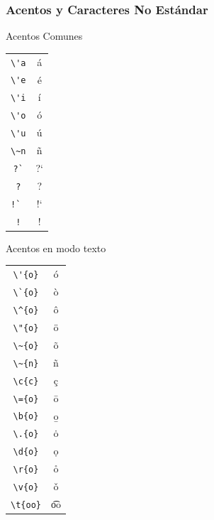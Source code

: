 \documentclass[aspectratio=43]{beamer}%
\begin{document}
\begin{frame}[fragile]
\frametitle{\textbf{Acentos y Caracteres No Estándar}}
\justifying
 \begin{minipage}[l]{0.48\linewidth}
\begin{center}
Acentos Comunes

\begin{tabular}{|c|c|}\hline
  \verb+\'a+&\'a \\
  \verb+\'e+&\'e \\
  \verb+\'i+&\'i \\
  \verb+\'o+&\'o \\
  \verb+\'u+&\'u \\
  \verb+\~n+&\~n \\
  \verb+?`+&?` \\
  \verb+?+&? \\
  \verb+!` +&!`\\
  \verb+!+&! \\\hline
\end{tabular}
\end{center}


\end{minipage}\hfill
\begin{minipage}[r]{0.48\linewidth}
\begin{center}
Acentos en modo texto

\begin{tabular}{|c|c|}\hline
 \verb+\'{o}+ & \'{o}\\
 \verb+\`{o}+ & \`{o}\\
 \verb+\^{o}+ & \^{o}\\
 \verb+\"{o}+ & \"{o}\\
 \verb+\~{o}+ & \~{o}\\
 \verb+\~{n}+ & \~{n}\\
 \verb+\c{c}+ & \c{c}\\
 \verb+\={o}+ & \={o}\\
 \verb+\b{o}+ & \b{o}\\
 \verb+\.{o}+ & \.{o}\\
 \verb+\d{o}+ & \d{o}\\
 \verb+\r{o}+ & \r{o}\\
 \verb+\v{o}+ & \v{o}\\
 \verb+\t{oo}+ & \t{oo}\\
	\hline
\end{tabular}

\end{center}

\end{minipage}

\end{frame}
\end{document}
